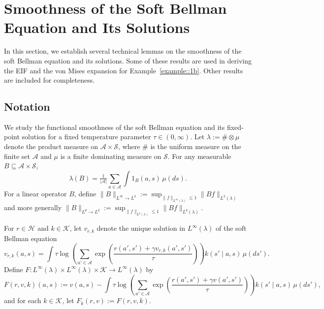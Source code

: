 \documentclass[11pt]{article}
\theoremstyle{plain}
\begin{document}
\section{Smoothness of the Soft Bellman Equation and Its Solutions}

In this section, we establish several technical lemmas on the smoothness of the soft Bellman equation and its solutions. Some of these results are used in deriving the EIF and the von Mises expansion for Example~\ref{example::1b}. Other results are included for completeness. 


\subsection{Notation}

We study the functional smoothness of the soft Bellman equation and its fixed-point solution for a fixed temperature parameter $\tau \in (0,\infty)$. Let $\lambda := \# \otimes \mu$ denote the product measure on $\mathcal{A}\times\mathcal{S}$, where $\#$ is the uniform measure on the finite set $\mathcal{A}$ and $\mu$ is a finite dominating measure on $\mathcal{S}$. For any measurable $B \subseteq \mathcal{A}\times\mathcal{S}$,
\[
\lambda(B) = \tfrac{1}{|\mathcal{A}|}\sum_{a \in \mathcal{A}} \int 1_B(a,s)\,\mu(ds).
\]
For a linear operator $B$, define $\|B\|_{L^\infty \to L^2} := \sup_{\|f\|_{L^\infty(\lambda)} \le 1}\|Bf\|_{L^2(\lambda)}$ and more generally $\|B\|_{L^p \to L^q} := \sup_{\|f\|_{L^p(\lambda)} \le 1}\|Bf\|_{L^q(\lambda)}$.

For $r \in \mathcal{H}$ and $k \in \mathcal{K}$, let $v_{r,k}$ denote the unique solution in $L^\infty(\lambda)$ of the soft Bellman equation
\[
v_{r,k}(a,s) = \int \tau \log\!\left(\sum_{a'\in\mathcal{A}}\exp\!\left(\frac{r(a',s')+\gamma v_{r,k}(a',s')}{\tau}\right)\right)k(s'\mid a,s)\,\mu(ds').
\]
Define $F: L^\infty(\lambda)\times L^\infty(\lambda)\times\mathcal{K}\to L^\infty(\lambda)$ by
\[
F(r,v,k)(a,s) := v(a,s) - \int \tau \log\!\left(\sum_{a'\in\mathcal{A}}\exp\!\left(\frac{r(a',s')+\gamma v(a',s')}{\tau}\right)\right)k(s'\mid a,s)\,\mu(ds'),
\]
and for each $k \in \mathcal{K}$, let $F_k(r,v):=F(r,v,k)$.  
\end{document}
